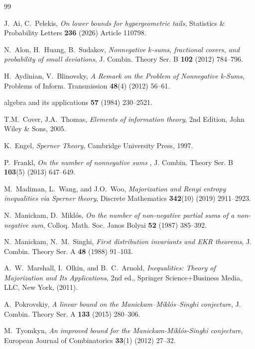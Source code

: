 \documentclass[11pt]{article}
\begin{document}
\begin{thebibliography}{99}


 J.~Ai, C.~Pelekis, \textit{On lower bounds for hypergeometric tails}, Statistics \& Probability Letters \textbf{236} (2026) Article 110798.  

 N.~Alon, H.~Huang, B.~Sudakov, 
\textit{Nonnegative $k$-sums, fractional covers, and probability of small deviations}, 
J. Combin. Theory Ser. B \textbf{102} (2012) 784--796.

 H.~Aydinian, V.~Blinovsky, \textit{A Remark on the Problem of Nonnegative k-Sums}, Problems of Inform. Transmission \textbf{48}(4) (2012) 56--61. 

algebra and its applications \textbf{57} (1984) 230--2521.



 T.M.~Cover, J.A.~Thomas, \textit{Elements of information theory}, 2nd Edition, John Wiley \& Sons, 2005. 

 K.~Engel, \textit{Sperner Theory}, Cambridge University Press, 1997.

 P.~Frankl, \textit{On the number of nonnegative sums
}, J. Combin. Theory Ser. B
\textbf{103}(5) (2013) 647--649.

 M.~Madiman, L.~Wang, and J.O.~Woo, \textit{Majorization and Renyi entropy inequalities via Sperner
theory}, Discrete Mathematics \textbf{342}(10) (2019) 2911--2923.


 N.~Manickam, D.~Mikl\'os, \textit{On the number of non-negative partial sums of a non-negative
sum}, Colloq. Math. Soc. Janos Bolyai \textbf{52} (1987) 385--392.

 N.~Manickam, N.~M.~Singhi, \textit{First distribution invariants and EKR theorems}, J. Combin. Theory Ser. A \textbf{48} (1988) 91--103.

 A.~W.~Marshall, I.~Olkin, and B.~C.~Arnold, \textit{Inequalities: Theory of Majorization and Its
Applications}, 2nd ed., Springer Science+Business Media, LLC, New York, (2011).





 A.~Pokrovskiy, \textit{A linear bound on the Manickam–Mikl\'os–Singhi conjecture}, J. Combin. Theory Ser. A
\textbf{133} (2015) 280--306.


  M.~Tyomkyn, \textit{An improved bound for the Manickam-Mikl\'os-Singhi conjecture}, 
European Journal of Combinatorics \textbf{33}(1) (2012)
27--32. 







 

\end{thebibliography}
\end{document}
